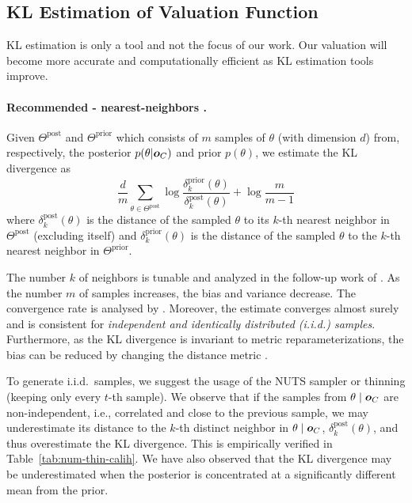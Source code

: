 \documentclass{article}
\theoremstyle{plain}
\theoremstyle{definition}
\theoremstyle{remark}
\renewcommand{\citet}[1]{\cite{#1}}
\begin{document}
\subsection{KL Estimation of Valuation Function}\label{app:val-compute}

KL estimation is only a tool and not the focus of our work. Our valuation will become more accurate and computationally efficient as KL estimation tools
improve.

\paragraph{Recommended - nearest-neighbors \cite{perez2008kl,wang2009kl}.}
Given $\Theta^{\text{post}}$ and $\Theta^{\text{prior}}$  which consists of $m$ samples of $\theta$ (with dimension $d$) from, respectively, the posterior $p(\theta|{\bm{o}}_C)$ and prior $p(\theta)$, we estimate the KL divergence as
\[
\frac{d}{m} \sum_{\theta \in \Theta^{\text{post}}} \log \frac{\delta_k^{\text{prior}}(\theta)}{\delta_k^{\text{post}}(\theta)} + \log \frac{m}{m-1}
\]
where $\delta_k^{\text{post}}(\theta)$ is the distance of the sampled $\theta$ to its $k$-th nearest neighbor in $\Theta^{\text{post}}$ (excluding itself) and $\delta_k^{\text{prior}}(\theta)$ is the distance of the sampled $\theta$ to the $k$-th nearest neighbor in $\Theta^{\text{prior}}$.

The number $k$ of neighbors is tunable and analyzed in 
 the follow-up work of \citet{singh2016finite}.
As the number $m$ of samples increases, the bias and variance decrease. The convergence rate is analysed by \citet{zhao2020klbv}. Moreover, the estimate converges almost surely \cite{perez2008kl} and is consistent \cite{wang2009kl} for \emph{independent and identically distributed (i.i.d.) samples}.
Furthermore, as the KL divergence is invariant to metric reparameterizations, the bias can be reduced by changing the distance metric \cite{noh2014bias,wang2009kl}.

To generate i.i.d.~samples, we suggest the usage of the NUTS sampler or thinning (keeping only every $t$-th sample). 
We observe that if the samples from $\theta\mid{\bm{o}}_C$ are non-independent, i.e., correlated and close to the previous sample, we may underestimate its distance to the $k$-th distinct neighbor in $\theta\mid{\bm{o}}_C$, $\delta_k^{\text{post}}(\theta)$, and thus overestimate the KL divergence. This is empirically verified in Table~\ref{tab:num-thin-calih}.
We have also observed that the KL divergence may be underestimated when the posterior is concentrated at a significantly different mean from the prior.
\end{document}
